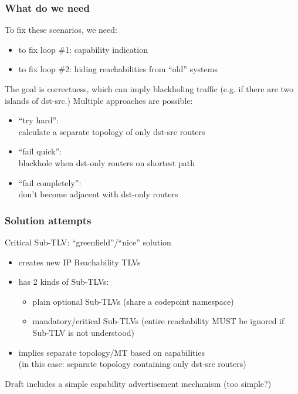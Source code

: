 \documentclass[12pt]{beamer}
\begin{document}
\begin{frame}
  \frametitle{What do we need}
  To fix these scenarios, we need:
  \begin{itemize}
    \item to fix loop \#1: capability indication
    \item to fix loop \#2: hiding reachabilities from ``old'' systems
  \end{itemize}
  \vspace{5mm}
  The goal is correctness, which can imply blackholing traffic (e.g. if there
  are two islands of dst-src.)  Multiple approaches are possible:
  \begin{itemize}
    \item ``try hard'':\\\hspace{10mm}calculate a separate topology of only dst-src routers
    \item ``fail quick'':\\\hspace{10mm}blackhole when dst-only routers on shortest path
    \item ``fail completely'':\\\hspace{10mm}don't become adjacent with dst-only routers
  \end{itemize}
\end{frame}

\begin{frame}
  \frametitle{Solution attempts}
  Critical Sub-TLV: ``greenfield''/``nice'' solution
  \begin{itemize}
    \item creates new IP Reachability TLVs
    \item has 2 kinds of Sub-TLVs:
    \begin{itemize}
      \item plain optional Sub-TLVs (share a codepoint namespace)
      \item mandatory/critical Sub-TLVs (entire reachability MUST be ignored
        if Sub-TLV is not understood)
    \end{itemize}
    \item implies separate topology/MT based on capabilities\\(in this case:
      separate topology containing only dst-src routers)
  \end{itemize}
  Draft includes a simple capability advertisement mechanism (too simple?)
\end{frame}
\end{document}

